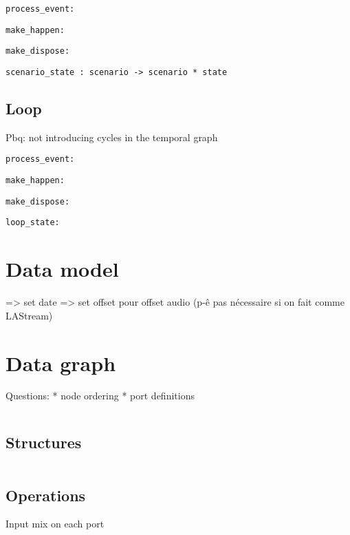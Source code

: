 \documentclass[applsci,article,submit,moreauthors,pdftex,10pt,a4paper]{mdpi}
\begin{document}
\begin{lstlisting}
process_event:
\end{lstlisting}
\begin{lstlisting}
make_happen:
\end{lstlisting}
\begin{lstlisting}
make_dispose:
\end{lstlisting}

\begin{lstlisting}
scenario_state : scenario -> scenario * state
\end{lstlisting}

\subsection{Loop}\label{sec.loop}
Pbq: not introducing cycles in the temporal graph
\begin{lstlisting}
process_event:
\end{lstlisting}
\begin{lstlisting}
make_happen:
\end{lstlisting}
\begin{lstlisting}
make_dispose:
\end{lstlisting}
\begin{lstlisting}
loop_state:
\end{lstlisting}
\section{Data model}\label{sec.datamodel}
=> set date
=> set offset pour offset audio (p-ê pas nécessaire si on fait comme LAStream)

\section{Data graph}
Questions: 
* node ordering
* port definitions

\begin{lstlisting}

\end{lstlisting}

\subsection{Structures}

\begin{lstlisting}
\end{lstlisting}
\subsection{Operations}
Input mix on each port
\end{document}
